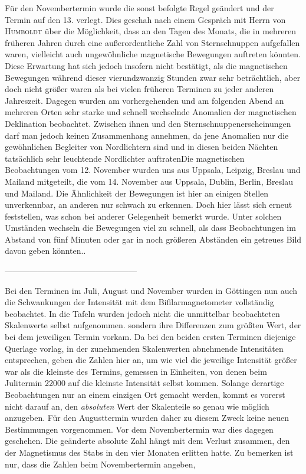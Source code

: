 Für den Novembertermin wurde die sonst befolgte Regel geändert und der Termin auf den 13. verlegt. Dies geschah nach einem Gespräch mit Herrn von \textsc{Humboldt} über die Möglichkeit, dass an den Tagen des Monats, die in mehreren früheren Jahren durch eine außerordentliche Zahl von Sternschnuppen aufgefallen waren,
vielleicht auch ungewöhnliche magnetische Bewegungen auftreten könnten. Diese Erwartung hat sich jedoch insofern nicht bestätigt, als die magnetischen Bewegungen während dieser vierundzwanzig Stunden zwar sehr beträchtlich, aber doch nicht größer waren als bei vielen früheren Terminen zu jeder anderen Jahreszeit. Dagegen wurden am vorhergehenden und am folgenden Abend an mehreren Orten sehr starke und schnell wechselnde Anomalien der magnetischen Deklination beobachtet. Zwischen ihnen und den Sternschnuppenerscheinungen darf man jedoch keinen Zusammenhang annehmen, da jene Anomalien nur die gewöhnlichen Begleiter von Nordlichtern sind und in diesen beiden Nächten tatsächlich sehr leuchtende Nordlichter auftraten\expandafter\def\csname HistoricalNoteText583\endcsname{Die magnetischen Beobachtungen vom 12. November wurden uns aus Uppsala, Leipzig, Breslau und Mailand mitgeteilt, die vom 14. November aus Uppsala, Dublin, Berlin, Breslau und Mailand. Die Ähnlichkeit der Bewegungen ist hier an einigen Stellen unverkennbar, an anderen nur schwach zu erkennen. Doch hier lässt sich erneut feststellen, was schon bei anderer Gelegenheit bemerkt wurde. Unter solchen Umständen wechseln die Bewegungen viel zu schnell, als dass Beobachtungen im Abstand von fünf Minuten oder gar in noch größeren Abständen ein getreues Bild davon geben könnten.}.
\begin{center}\small
---\enspace---\enspace---\enspace---\enspace---\enspace---\enspace---\enspace---\enspace---\enspace---\enspace---\enspace---\enspace---\enspace---\enspace---\enspace---
\end{center}
Bei den Terminen im Juli, August und November wurden in Göttingen nun auch die Schwankungen der Intensität mit dem Bifilarmagnetometer vollständig beobachtet. In die Tafeln wurden jedoch nicht die unmittelbar beobachteten Skalenwerte selbst aufgenommen. sondern ihre Differenzen zum größten Wert, der bei dem jeweiligen Termin vorkam. Da bei den beiden ersten Terminen diejenige Querlage vorlag, in der zunehmenden Skalenwerten abnehmende Intensitäten entsprechen, geben die Zahlen hier an, um wie viel die jeweilige Intensität größer war als die kleinste des Termins, gemessen in Einheiten, von denen beim Julitermin 22000 auf die kleinste Intensität selbst kommen. Solange derartige Beobachtungen nur an einem einzigen Ort gemacht werden, kommt es vorerst nicht darauf an, den \textit{absoluten} Wert der Skalenteile so genau wie möglich anzugeben. Für den Augusttermin wurden daher zu diesem Zweck keine neuen Bestimmungen vorgenommen. Vor dem Novembertermin war dies dagegen geschehen. Die geänderte absolute Zahl hängt mit dem Verlust zusammen, den der Magnetismus des Stabs in den vier Monaten erlitten hatte. Zu bemerken ist nur, dass die Zahlen beim Novembertermin angeben,
